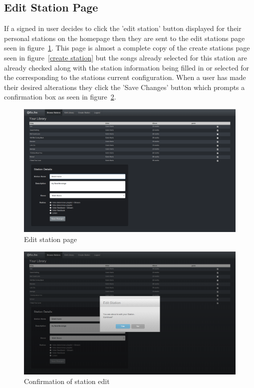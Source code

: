 \documentclass[a4paper, 12pt]{report}
\begin{document}
\subsection{Edit Station Page}
If a signed in user decides to click the 'edit station' button displayed for their personal stations on the homepage then they are sent to the edit stations page seen in figure~\ref{edit-station}. This page is almost a complete copy of the create stations page seen in figure~\ref{create station} but the songs already selected for this station are already checked along with the station information being filled in or selected for the corresponding to the stations current configuration. 
When a user has made their desired alterations they click the 'Save Changes' button which prompts a confirmation box as seen in figure~\ref{edit-station-confirm}.
\begin{figure}[H]
  \centering
    \includegraphics[width=1.0\textwidth]{screenshots/edit-station.png}
    \caption{Edit station page}
    \label{edit-station}
\end{figure}
\begin{figure}[H]
  \centering
    \includegraphics[width=1.0\textwidth]{screenshots/edit-station-confirm.png}
    \caption{Confirmation of station edit}
    \label{edit-station-confirm}
\end{figure}
\end{document}
